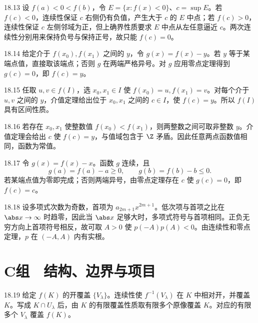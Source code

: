 \begin{solution}{18.13}
设 \(f(a)<0<f(b)\)，令 \(E=\{x:f(x)<0\}\)、\(c=\sup E\)。若 \(f(c)<0\)，连续性保证 \(c\) 右侧仍有负值，产生大于 \(c\) 的 \(E\) 中点；若 \(f(c)>0\)，连续性保证 \(c\) 左侧邻域为正，但上确界性质要求 \(E\) 中点从左任意逼近 \(c\)。两次连续性分别用来保持负号与保持正号，故只能 \(f(c)=0\)。
\end{solution}

\begin{solution}{18.14}
给定介于 \(f(x_0),f(x_1)\) 之间的 \(y\)，令 \(g(x)=f(x)-y\)。若 \(y\) 等于某端点值，直接取该端点；否则 \(g\) 在两端严格异号。对 \(g\) 应用零点定理得到 \(g(c)=0\)，即 \(f(c)=y\)。
\end{solution}

\begin{solution}{18.15}
任取 \(u,v\in f(I)\)，选 \(x_0,x_1\in I\) 使 \(f(x_0)=u,f(x_1)=v\)。对每个介于 \(u,v\) 之间的 \(y\)，介值定理给出位于 \(x_0,x_1\) 之间的 \(c\in I\)，使 \(f(c)=y\)。所以 \(f(I)\) 具有区间性质。
\end{solution}

\begin{solution}{18.16}
若存在 \(x_0,x_1\) 使整数值 \(f(x_0)<f(x_1)\)，则两整数之间可取非整数 \(y\)。介值定理会给出 \(c\) 使 \(f(c)=y\)，与值域包含于 \(\Z\) 矛盾。因此任意两点函数值相同，函数为常值。
\end{solution}

\begin{solution}{18.17}
令 \(g(x)=f(x)-x\)。函数 \(g\) 连续，且
\[
 g(a)=f(a)-a\ge0,\qquad
 g(b)=f(b)-b\le0.
\]
若某端点值为零即完成；否则两端异号，由零点定理存在 \(c\) 使 \(g(c)=0\)，即 \(f(c)=c\)。
\end{solution}

\begin{solution}{18.18}
设多项式次数为奇数，首项为 \(a_{2m+1}x^{2m+1}\)。低次项与首项之比在 \(\abs x\to\infty\) 时趋零，因此当 \(\abs x\) 足够大时，多项式符号与首项相同。正负无穷方向上首项符号相反，故可取 \(A>0\) 使 \(p(-A)p(A)<0\)。由连续性和零点定理，\(p\) 在 \((-A,A)\) 内有实根。
\end{solution}

\section*{C组　结构、边界与项目}

\begin{solution}{18.19}
给定 \(f(K)\) 的开覆盖 \(\{V_\lambda\}\)。连续性使 \(f^{-1}(V_\lambda)\) 在 \(K\) 中相对开，并覆盖 \(K\)。写成 \(K\cap U_\lambda\) 后，由 \(K\) 的有限覆盖性质取有限多个原像覆盖 \(K\)。对应的有限多个 \(V_\lambda\) 覆盖 \(f(K)\)。
\end{solution}

